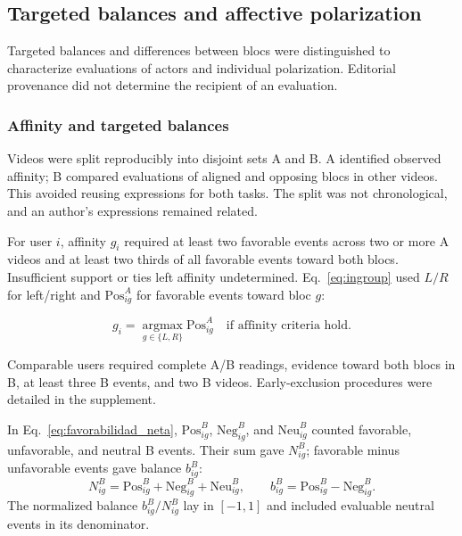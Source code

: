 \documentclass[conference,letterpaper]{IEEEtran}
\newcommand{\Pos}{\mathrm{Pos}}
\newcommand{\Neg}{\mathrm{Neg}}
\newcommand{\Neu}{\mathrm{Neu}}
\begin{document}
\subsection{Targeted balances and affective polarization}

Targeted balances and differences between blocs were distinguished to characterize evaluations of actors and individual polarization. Editorial provenance did not determine the recipient of an evaluation.

\subsubsection{Affinity and targeted balances}

Videos were split reproducibly into disjoint sets A and B. A identified observed affinity; B compared evaluations of aligned and opposing blocs in other videos. This avoided reusing expressions for both tasks. The split was not chronological, and an author's expressions remained related.

For user $i$, affinity $g_i$ required at least two favorable events across two or more A videos and at least two thirds of all favorable events toward both blocs. Insufficient support or ties left affinity undetermined. Eq.~\eqref{eq:ingroup} used $L/R$ for left/right and $\Pos^A_{ig}$ for favorable events toward bloc $g$:

\begin{equation}
g_i=\operatorname*{argmax}_{g\in\{L,R\}}\Pos^A_{ig}
\quad\text{if affinity criteria hold.}
\label{eq:ingroup}
\end{equation}

Comparable users required complete A/B readings, evidence toward both blocs in B, at least three B events, and two B videos. Early-exclusion procedures were detailed in the supplement.

In Eq.~\eqref{eq:favorabilidad_neta}, $\Pos^B_{ig}$, $\Neg^B_{ig}$, and $\Neu^B_{ig}$ counted favorable, unfavorable, and neutral B events. Their sum gave $N^B_{ig}$; favorable minus unfavorable events gave balance $b^B_{ig}$:
\begin{equation}
N^B_{ig}=\Pos^B_{ig}+\Neg^B_{ig}+\Neu^B_{ig},\qquad b^B_{ig}=\Pos^B_{ig}-\Neg^B_{ig}.
\label{eq:favorabilidad_neta}
\end{equation}
The normalized balance $b^B_{ig}/N^B_{ig}$ lay in $[-1,1]$ and included evaluable neutral events in its denominator.
\end{document}

